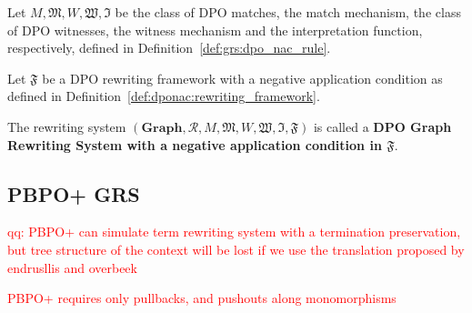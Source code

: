 
    \begin{definition}
      Let $M, \mathfrak{M}, W, \mathfrak{W}, \mathfrak{I}$ be the class of DPO matches, the match mechanism, the class of DPO witnesses, the witness mechanism and the interpretation function, respectively, defined in Definition~\ref{def:grs:dpo_nac_rule}.

      Let $\mathfrak{F}$ be a DPO rewriting framework with a negative application condition as defined in Definition~\ref{def:dponac:rewriting_framework}.

      The rewriting system $(\mathbf{Graph}, \mathcal{R}, M, \mathfrak{M}, W, \mathfrak{W}, \mathfrak{I}, \mathfrak{F})$ is called a \textbf{DPO Graph Rewriting System with a negative application condition in $\mathfrak{F}$}.
    \end{definition}
    
    \subsection{PBPO+ GRS}
    \textcolor{red}{qq: PBPO+ can simulate term rewriting system with a termination preservation, but tree structure of the context will be lost if we use the translation proposed by endrusllis and overbeek}
    
    \textcolor{red}{PBPO+ requires only pullbacks, and pushouts along monomorphisms}

